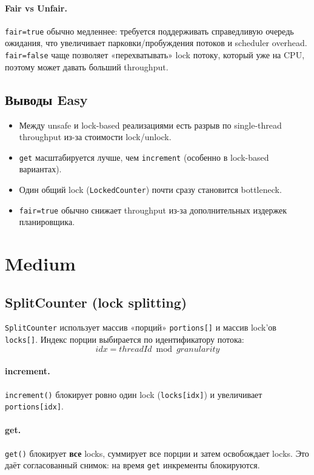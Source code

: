 \documentclass[a4paper,12pt]{article}
\begin{document}
\paragraph{Fair vs Unfair.}
\texttt{fair=true} обычно медленнее: требуется поддерживать справедливую очередь ожидания,
что увеличивает парковки/пробуждения потоков и scheduler overhead.
\texttt{fair=false} чаще позволяет «перехватывать» lock потоку, который уже на CPU,
поэтому может давать больший throughput.

\subsection{Выводы Easy}

\begin{itemize}
  \item Между unsafe и lock-based реализациями есть разрыв по single-thread throughput из-за стоимости lock/unlock.
  \item \texttt{get} масштабируется лучше, чем \texttt{increment} (особенно в lock-based вариантах).
  \item Один общий lock (\texttt{LockedCounter}) почти сразу становится bottleneck.
  \item \texttt{fair=true} обычно снижает throughput из-за дополнительных издержек планировщика.
\end{itemize}

\section{Medium}

\subsection{SplitCounter (lock splitting)}

\texttt{SplitCounter} использует массив «порций» \texttt{portions[]} и массив lock'ов \texttt{locks[]}.
Индекс порции выбирается по идентификатору потока:
\[
  idx = threadId \bmod granularity
\]

\paragraph{increment.}
\texttt{increment()} блокирует ровно один lock (\texttt{locks[idx]}) и увеличивает \texttt{portions[idx]}.

\paragraph{get.}
\texttt{get()} блокирует \textbf{все} locks, суммирует все порции и затем освобождает locks.
Это даёт согласованный снимок: на время \texttt{get} инкременты блокируются.
\end{document}
